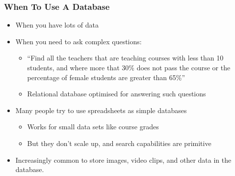 \documentclass[dvipsnames,handout]{beamer}
\begin{document}
\begin{frame} \frametitle{When To Use A Database}
  \begin{itemize}
  \item  When you have lots of data
  \item When you need to ask complex questions:
    \begin{itemize}
    \item ``Find all the teachers that are teaching courses with less
      than 10 students, and where more that 30\% does not pass the
      course or the percentage of female students are greater than 65\%''
    \item Relational database optimised for answering such questions
    \end{itemize}
  \item Many people try to use spreadsheets as simple databases
    \begin{itemize}
    \item Works for small data sets like course grades
    \item But they don't scale up, and search capabilities are
      primitive
    \end{itemize}
  \item Increasingly common to store images, video clips, and other
    data in the database.
  \end{itemize}
\end{frame}
\end{document}
